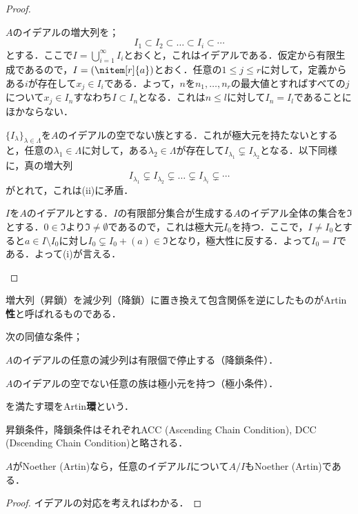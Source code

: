 \begin{proof}
	\begin{eqv}[3]
		\item 
		$A$のイデアルの増大列を；
		\[I_1\subset I_2\subset\dots\subset I_i\subset\cdots\]
		とする．ここで$I=\bigcup_{i=1}^\infty I_i$とおくと，これはイデアルである．仮定から有限生成であるので，$I=(\nitem[r]{a})$とおく．任意の$1\leq j\leq r$に対して，定義からある$i$が存在して$x_j\in I_i$である．よって，$n$を$n_1,\dots,n_r$の最大値とすればすべての$j$について$x_j\in I_n$すなわち$I\subset I_{n}$となる．これは$n\leq l$に対して$I_{n}=I_l$であることにほかならない．
		\item
		$\{I_{\lambda}\}_{\lambda\in\Lambda}$を$A$のイデアルの空でない族とする．これが極大元を持たないとすると，任意の$\lambda_1\in\Lambda$に対して，ある$\lambda_2\in\Lambda$が存在して$I_{\lambda_1}\subsetneq I_{\lambda_2}$となる．以下同様に，真の増大列
		\[I_{\lambda_1}\subsetneq I_{\lambda_2}\subsetneq\dots\subsetneq I_{\lambda_i}\subsetneq\cdots\]
		がとれて，これは(ii)に矛盾．
		\item 
		$I$を$A$のイデアルとする．$I$の有限部分集合が生成する$A$のイデアル全体の集合を$\Im$とする．$0\in\Im$より$\Im\neq\emptyset$であるので，これは極大元$I_0$を持つ．ここで，$I\neq I_0$とすると$a\in I\setminus I_0$に対し$I_0\subsetneq I_0+(a)\in\Im$となり，極大性に反する．よって$I_0=I$である．よって(i)が言える．
	\end{eqv}
\end{proof}

増大列（昇鎖）を減少列（降鎖）に置き換えて包含関係を逆にしたものがArtin\textbf{性}と呼ばれるものである．

\begin{defi}[Artin環]
	次の同値な条件；
	\begin{sakura}
		\item  $A$のイデアルの任意の減少列は有限個で停止する（降鎖条件）．
		\item $A$のイデアルの空でない任意の族は極小元を持つ（極小条件）．
	\end{sakura}
	を満たす環をArtin\textbf{環}という．
\end{defi}

昇鎖条件，降鎖条件はそれぞれACC (Ascending Chain Condition), DCC (Dscending Chain Condition)と略される．

\begin{prop}
	$A$がNoether (Artin)なら，任意のイデアル$I$について$A/I$もNoether (Artin)である．
\end{prop}
\begin{proof}
	イデアルの対応を考えればわかる．
\end{proof}

